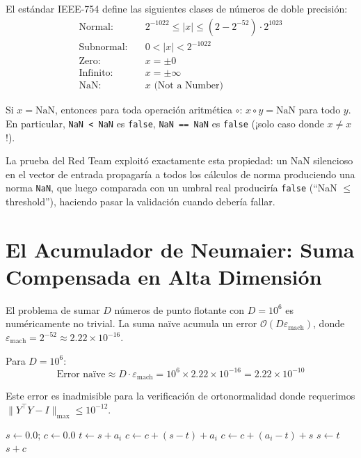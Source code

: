 \begin{definition}
El estándar IEEE-754 define las siguientes clases de números de doble precisión:
\begin{align}
\text{Normal:} &\quad 2^{-1022} \le |x| \le (2 - 2^{-52}) \cdot 2^{1023} \\
\text{Subnormal:} &\quad 0 < |x| < 2^{-1022} \\
\text{Zero:} &\quad x = \pm 0 \\
\text{Infinito:} &\quad x = \pm\infty \\
\text{NaN:} &\quad x \text{ (Not a Number)}
\end{align}
\end{definition}

\begin{theorem}
Si $x = \text{NaN}$, entonces para toda operación aritmética $\circ$:
$x \circ y = \text{NaN}$ para todo $y$. En particular, \texttt{NaN < NaN} es
\texttt{false}, \texttt{NaN == NaN} es \texttt{false} (¡solo caso donde $x \ne x$!).
\end{theorem}

La prueba del Red Team exploitó exactamente esta propiedad: un NaN silencioso
en el vector de entrada propagaría a todos los cálculos de norma produciendo
una norma \texttt{NaN}, que luego comparada con un umbral real produciría
\texttt{false} (``NaN $\le$ threshold''), haciendo pasar la validación cuando
debería fallar.

\section{El Acumulador de Neumaier: Suma Compensada en Alta Dimensión}

El problema de sumar $D$ números de punto flotante con $D = 10^6$ es
numéricamente no trivial. La suma naïve acumula un error $\mathcal{O}(D\varepsilon_{\text{mach}})$,
donde $\varepsilon_{\text{mach}} = 2^{-52} \approx 2.22 \times 10^{-16}$.

Para $D = 10^6$:
\begin{equation}
\text{Error naïve} \approx D \cdot \varepsilon_{\text{mach}} = 10^6 \times 2.22 \times 10^{-16} = 2.22 \times 10^{-10}
\end{equation}

Este error es inadmisible para la verificación de ortonormalidad donde requerimos
$\|{Y^\top Y - I}\|_{\max} \le 10^{-12}$.

\begin{algorithm}


\begin{algorithmic}[1]
  \State $s \gets 0.0$; $c \gets 0.0$ 
    \State $t \gets s + a_i$
      \State $c \gets c + (s - t) + a_i$ 
    \Else
      \State $c \gets c + (a_i - t) + s$ 
    \EndIf
    \State $s \gets t$
  \EndFor
  \State \Return $s + c$
\EndProcedure
\end{algorithmic}
\end{algorithm}

